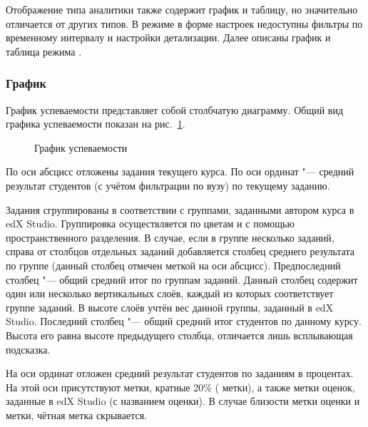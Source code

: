 Отображение типа аналитики  также содержит график и таблицу, но значительно
отличается от других типов. В режиме  в форме настроек недоступны фильтры
по временному интервалу и настройки детализации. Далее описаны график и таблица режима .

\subsubsection{График}

График успеваемости представляет собой столбчатую диаграмму. 
Общий вид графика успеваемости показан на рис.~\ref{analytics:progress:chart}.


\begin{figure}[H]
	\caption{График успеваемости}
	\label{analytics:progress:chart}
\end{figure}

По оси абсцисс отложены задания текущего курса. По оси ординат "--- средний результат студентов 
(с учётом фильтрации по вузу) по текущему заданию.

Задания сгруппированы в соответствии с группами, заданными автором курса в edX Studio. 
Группировка осуществляется по цветам и с помощью пространственного разделения.
В случае, если в группе несколько заданий, справа от столбцов отдельных заданий добавляется столбец 
среднего результата по группе (данный столбец отмечен меткой на оси абсцисс). Предпоследний столбец 
"--- общий средний итог по группам заданий. Данный столбец содержит один или несколько вертикальных слоёв,
каждый из которых соответствует группе заданий. В высоте слоёв учтён вес данной группы, 
заданный в edX Studio. Последний столбец "--- общий средний итог студентов по данному курсу. Высота его
равна высоте предыдущего столбца, отличается лишь всплывающая подсказка.

На оси ординат отложен средний результат студентов по заданиям в процентах. На этой оси присутствуют метки,
кратные 20\% ( метки), а также метки оценок, заданные в edX Studio (с названием оценки). 
В случае близости метки оценки и  метки, чётная метка скрывается.

